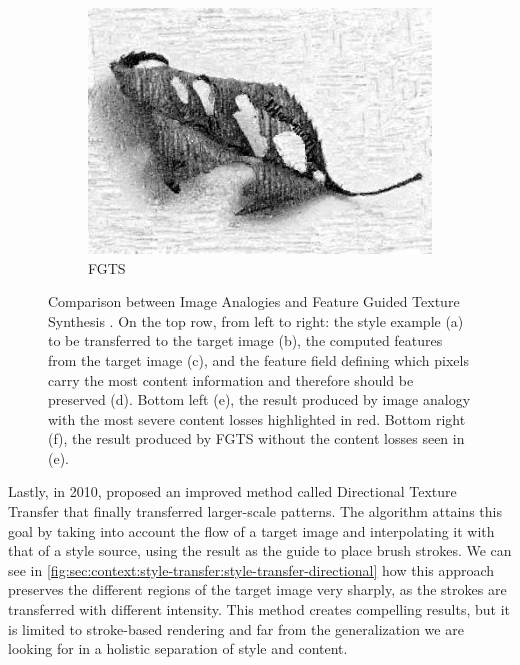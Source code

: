 \begin{figure}[t]
\begin{subfigure}[b]{0.5\textwidth}
    \includegraphics[width=\textwidth]{gfx/style-transfer-feature-6}
    \caption{FGTS}
  \end{subfigure}
  \caption{
    Comparison between Image Analogies and Feature Guided Texture Synthesis \cite{Xie2007}.
    On the top row, from left to right: the style example (a) to be transferred to the target image (b), the computed features from the target image (c), and the feature field defining which pixels carry the most content information and therefore should be preserved (d).
    Bottom left (e), the result produced by image analogy with the most severe content losses highlighted in red.
    Bottom right (f), the result produced by FGTS without the content losses seen in (e).
  }
  \label{fig:sec:context:style-transfer:style-transfer-feature}
\end{figure}

Lastly, in 2010, \citet{Lee2010} proposed an improved method called Directional Texture Transfer that finally transferred larger-scale patterns.
The algorithm attains this goal by taking into account the flow of a target image and interpolating it with that of a style source, using the result as the guide to place brush strokes.
We can see in \autoref{fig:sec:context:style-transfer:style-transfer-directional} how this approach preserves the different regions of the target image very sharply, as the strokes are transferred with different intensity.
This method creates compelling results, but it is limited to stroke-based rendering and far from the generalization we are looking for in a holistic separation of style and content.

